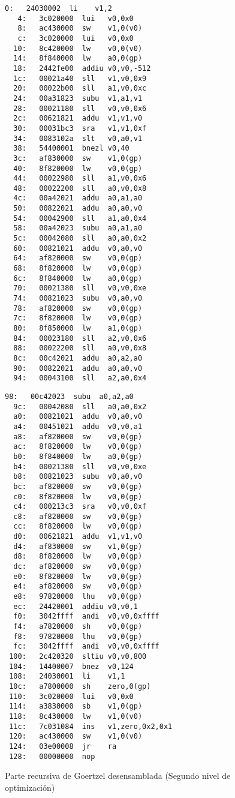 \begin{figure}[htb]
  \begin{minipage}{.45\textwidth}
\begin{lstlisting}[language={[mips]Assembler},basicstyle=\ttfamily\scriptsize]
   0:	24030002  li	v1,2
   4:	3c020000  lui	v0,0x0
   8:	ac430000  sw	v1,0(v0)
   c:	3c020000  lui	v0,0x0
  10:	8c420000  lw	v0,0(v0)
  14:	8f840000  lw	a0,0(gp)
  18:	2442fe00  addiu	v0,v0,-512
  1c:	00021a40  sll	v1,v0,0x9
  20:	00022b00  sll	a1,v0,0xc
  24:	00a31823  subu	v1,a1,v1
  28:	00021180  sll	v0,v0,0x6
  2c:	00621821  addu	v1,v1,v0
  30:	00031bc3  sra	v1,v1,0xf
  34:	0083102a  slt	v0,a0,v1
  38:	54400001  bnezl	v0,40
  3c:	af830000  sw	v1,0(gp)
  40:	8f820000  lw	v0,0(gp)
  44:	00022980  sll	a1,v0,0x6
  48:	00022200  sll	a0,v0,0x8
  4c:	00a42021  addu	a0,a1,a0
  50:	00822021  addu	a0,a0,v0
  54:	00042900  sll	a1,a0,0x4
  58:	00a42023  subu	a0,a1,a0
  5c:	00042080  sll	a0,a0,0x2
  60:	00821021  addu	v0,a0,v0
  64:	af820000  sw	v0,0(gp)
  68:	8f820000  lw	v0,0(gp)
  6c:	8f840000  lw	a0,0(gp)
  70:	00021380  sll	v0,v0,0xe
  74:	00821023  subu	v0,a0,v0
  78:	af820000  sw	v0,0(gp)
  7c:	8f820000  lw	v0,0(gp)
  80:	8f850000  lw	a1,0(gp)
  84:	00023180  sll	a2,v0,0x6
  88:	00022200  sll	a0,v0,0x8
  8c:	00c42021  addu	a0,a2,a0
  90:	00822021  addu	a0,a0,v0
  94:	00043100  sll	a2,a0,0x4
\end{lstlisting}
\end{minipage}
\hfill
\begin{minipage}{.45\textwidth}
\begin{lstlisting}[language={[mips]Assembler},basicstyle=\ttfamily\scriptsize]
  98:	00c42023  subu	a0,a2,a0
  9c:	00042080  sll	a0,a0,0x2
  a0:	00821021  addu	v0,a0,v0
  a4:	00451021  addu	v0,v0,a1
  a8:	af820000  sw	v0,0(gp)
  ac:	8f820000  lw	v0,0(gp)
  b0:	8f840000  lw	a0,0(gp)
  b4:	00021380  sll	v0,v0,0xe
  b8:	00821023  subu	v0,a0,v0
  bc:	af820000  sw	v0,0(gp)
  c0:	8f820000  lw	v0,0(gp)
  c4:	000213c3  sra	v0,v0,0xf
  c8:	af820000  sw	v0,0(gp)
  cc:	8f820000  lw	v0,0(gp)
  d0:	00621821  addu	v1,v1,v0
  d4:	af830000  sw	v1,0(gp)
  d8:	8f820000  lw	v0,0(gp)
  dc:	af820000  sw	v0,0(gp)
  e0:	8f820000  lw	v0,0(gp)
  e4:	af820000  sw	v0,0(gp)
  e8:	97820000  lhu	v0,0(gp)
  ec:	24420001  addiu	v0,v0,1
  f0:	3042ffff  andi	v0,v0,0xffff
  f4:	a7820000  sh	v0,0(gp)
  f8:	97820000  lhu	v0,0(gp)
  fc:	3042ffff  andi	v0,v0,0xffff
 100:	2c420320  sltiu	v0,v0,800
 104:	14400007  bnez	v0,124
 108:	24030001  li	v1,1
 10c:	a7800000  sh	zero,0(gp)
 110:	3c020000  lui	v0,0x0
 114:	a3830000  sb	v1,0(gp)
 118:	8c430000  lw	v1,0(v0)
 11c:	7c031084  ins	v1,zero,0x2,0x1
 120:	ac430000  sw	v1,0(v0)
 124:	03e00008  jr	ra
 128:	00000000  nop
 \end{lstlisting}
 \end{minipage}
 \label{goertzel_recursivo_ensamblador}
 \caption{Parte recursiva de Goertzel desensamblada (Segundo nivel de optimización)}
 \end{figure}

